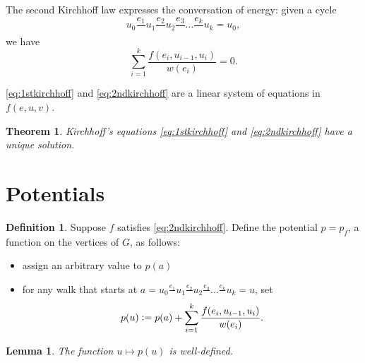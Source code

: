 \documentclass{report}
\newcommand{\defeq}{\vcentcolon=}
\newtheorem{theorem}{Theorem}[section]
\newtheorem{lemma}{Lemma}[section]
\theoremstyle{definition}
\newtheorem{definition}{Definition}[section]
\theoremstyle{remark}
\numberwithin{equation}{section}
\begin{document}
The second Kirchhoff law expresses the conversation of energy: given a cycle \[
    u_0 \frac{e_1}{} u_1 \frac{e_2}{} u_2 \frac{e_3}{}\ldots \frac{e_k}{} u_k = u_0,  
\]
we have
\begin{equation}\label{eq:2ndkirchhoff}
    \sum_{i=1}^k \frac{f(e_i, u_{i-1}, u_i)}{w(e_i)} = 0.
\end{equation}

\eqref{eq:1stkirchhoff} and \eqref{eq:2ndkirchhoff} are a linear system of equations in $f(e, u, v)$.

\begin{theorem}
    Kirchhoff's equations \eqref{eq:1stkirchhoff} and \eqref{eq:2ndkirchhoff} have a unique solution.
\end{theorem}

\section{Potentials}
\begin{definition}
    Suppose $f$ satisfies \eqref{eq:2ndkirchhoff}. Define the potential $p = p_f$, a function on the vertices of $G$, as follows:
    \begin{itemize}
        \item assign an arbitrary value to $p(a)$
        \item for any walk that starts at $a = u_0 \frac{e_1}{} u_1 \frac{e_2}{} u_2 \frac{e_3}{}\ldots \frac{e_k}{} u_k = u$, set \[
            p(u) \defeq p(a) + \sum_{i=1}^k \frac{f(e_i, u_{i-1}, u_i)}{w(e_i)}. 
        \]
    \end{itemize}
\end{definition}
\begin{lemma}
    The function $u \mapsto p(u)$ is well-defined.
\end{lemma}
\end{document}
